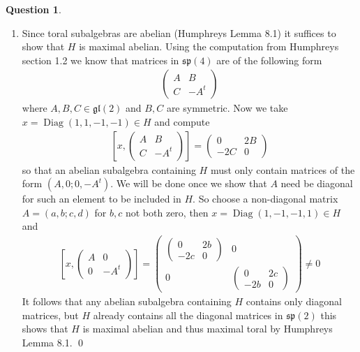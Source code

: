 \documentclass[10.5pt]{article}
\theoremstyle{definition}
\newtheorem{pb}{Question}
\numberwithin{example}{subsection}
\numberwithin{proposition}{subsection}
\begin{document}
    \begin{pb}
        \begin{enumerate}
            \item Since toral subalgebras are abelian (Humphreys Lemma 8.1) it suffices to show that \(H\) is maximal abelian. Using the computation from Humphreys section 1.2 we know that matrices in \(\mathfrak{sp}(4)\) are of the following form
            \begin{align}
                \begin{pmatrix} A & B \\ C & -A^t \end{pmatrix}
            \end{align}
            where \(A,B,C \in \mathfrak{gl}(2)\) and \(B,C\) are symmetric. Now we take \(x = \operatorname{Diag}(1,1,-1,-1) \in H\) and compute
            \begin{align}
                \left[x,\begin{pmatrix} A & B \\ C & -A^t \end{pmatrix}\right] = \begin{pmatrix} 0 & 2B \\ -2C & 0 \end{pmatrix}
            \end{align}
            so that an abelian subalgebra containing \(H\) must only contain matrices of the form \((A, 0 ; 0, -A^t)\). We will be done once we show that \(A\) need be diagonal for such an element to be included in \(H\). So choose a non-diagonal matrix \(A = (a,b;c,d)\) for \(b,c\) not both zero, then \(x = \operatorname{Diag}(1,-1,-1,1) \in H\) and
            \begin{align}
                \left[x,\begin{pmatrix} A & 0 \\ 0 & -A^t \end{pmatrix}\right] = \begin{pmatrix} \begin{pmatrix} 0 & 2b \\ -2c & 0 \end{pmatrix} & 0 \\ 0 & \begin{pmatrix} 0 & 2c \\ -2b & 0 \end{pmatrix} \end{pmatrix} \neq 0
            \end{align}
            It follows that any abelian subalgebra containing \(H\) contains only diagonal matrices, but \(H\) already contains all the diagonal matrices in \(\mathfrak{sp}(2)\) this shows that \(H\) is maximal abelian and thus maximal toral by Humphreys Lemma 8.1. \qed


\end{enumerate}
\end{pb}
\end{document}
